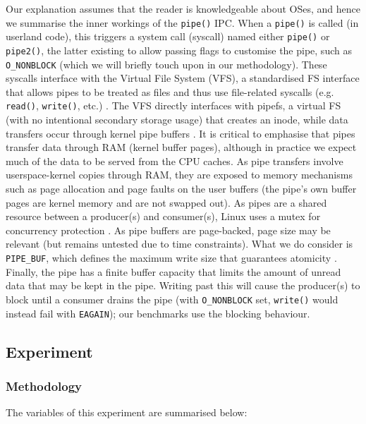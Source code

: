 \documentclass[11pt,sigconf,nonacm]{acmart}
\begin{document}
Our explanation assumes that the reader is knowledgeable about OSes, and hence we summarise the inner workings of the \texttt{pipe()} IPC. When a \texttt{pipe()} is called (in userland code), this triggers a system call (syscall) named either \texttt{pipe()} or \texttt{pipe2()}, the latter existing to allow passing flags to customise the pipe, such as \texttt{O\_NONBLOCK} (which we will briefly touch upon in our methodology). These syscalls interface with the Virtual File System (VFS), a standardised FS interface that allows pipes to be treated as files and thus use file-related syscalls (e.g. \texttt{read()}, \texttt{write()}, etc.) \cite{LinuxVfsDocs}\cite{slideshare_linux_pipes}. The VFS directly interfaces with pipefs, a virtual FS (with no intentional secondary storage usage) that creates an inode, while data transfers occur through kernel pipe buffers \cite{slideshare_linux_pipes}. It is critical to emphasise that pipes transfer data through RAM (kernel buffer pages), although in practice we expect much of the data to be served from the CPU caches. As pipe transfers involve userspace-kernel copies through RAM, they are exposed to memory mechanisms such as page allocation and page faults on the user buffers (the pipe's own buffer pages are kernel memory and are not swapped out). As pipes are a shared resource between a producer(s) and consumer(s), Linux uses a mutex for concurrency protection \cite{slideshare_linux_pipes}. As pipe buffers are page-backed, page size may be relevant (but remains untested due to time constraints). What we do consider is \texttt{PIPE\_BUF}, which defines the maximum write size that guarantees atomicity \cite{linux_man_pipe7}. Finally, the pipe has a finite buffer capacity that limits the amount of unread data that may be kept in the pipe. Writing past this will cause the producer(s) to block until a consumer drains the pipe (with \texttt{O\_NONBLOCK} set, \texttt{write()} would instead fail with \texttt{EAGAIN}); our benchmarks use the blocking behaviour.

\subsection{Experiment}

\subsubsection{Methodology}

The variables of this experiment are summarised below:
\end{document}

